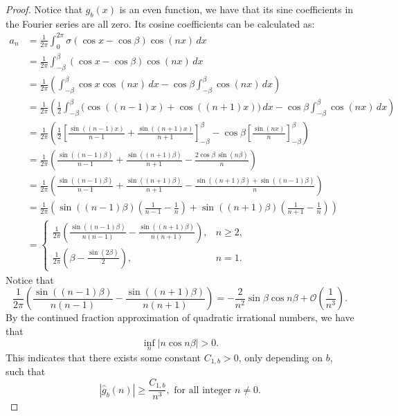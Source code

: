 \documentclass[12pt]{amsart}
\numberwithin{equation}{section}
\theoremstyle{remark}
\begin{document}
\begin{proof}
    Notice that $g_b(x)$ is an even function, we have that its sine coefficients in the Fourier series are all zero.
Its cosine coefficients can be calculated as:
\begin{equation}
\begin{aligned}
a_n &= \frac{1}{2\pi} \int_0^{2\pi} \sigma(\cos x - \cos \beta) \cos(nx)\,dx\\
&= \frac{1}{2\pi} \int_{-\beta}^{\beta} (\cos x - \cos \beta)\cos(nx)\,dx\\
&= \frac{1}{2\pi}\left(\int_{-\beta}^{\beta}\cos x\cos(nx)\,dx-\cos\beta\int_{-\beta}^{\beta}\cos(nx)\,dx\right)\\
&= \frac{1}{2\pi}\left(\frac{1}{2}\int_{-\beta}^{\beta}\big(\cos((n-1)x)+\cos((n+1)x)\big)\,dx-\cos\beta\int_{-\beta}^{\beta}\cos(nx)\,dx\right)\\
&= \frac{1}{2\pi}\left(\frac{1}{2}\left[\frac{\sin((n-1)x)}{n-1}+\frac{\sin((n+1)x)}{n+1}\right]_{-\beta}^{\beta}-\cos\beta\left[\frac{\sin(nx)}{n}\right]_{-\beta}^{\beta}\right)\\
&= \frac{1}{2\pi}\left(\frac{\sin((n-1)\beta)}{n-1}+\frac{\sin((n+1)\beta)}{n+1}-\frac{2\cos\beta\,\sin(n\beta)}{n}\right)\\
&= \frac{1}{2\pi}\left(\frac{\sin((n-1)\beta)}{n-1}+\frac{\sin((n+1)\beta)}{n+1}-\frac{\sin((n+1)\beta)+\sin((n-1)\beta)}{n}\right)\\
&= \frac{1}{2\pi}\left(\sin((n-1)\beta)\!\left(\frac{1}{n-1}-\frac{1}{n}\right)+\sin((n+1)\beta)\!\left(\frac{1}{n+1}-\frac{1}{n}\right)\right)\\
&=\begin{cases}
\displaystyle \frac{1}{2\pi}\!\left(\frac{\sin((n-1)\beta)}{n(n-1)}-\frac{\sin((n+1)\beta)}{n(n+1)}\right), & n\ge 2,\\[8pt]
\displaystyle \frac{1}{2\pi}\!\left(\beta-\frac{\sin(2\beta)}{2}\right), & n=1.
\end{cases}
\end{aligned}
\end{equation}
Notice that
\begin{equation}
    \frac{1}{2\pi}\!\left(\frac{\sin((n-1)\beta)}{n(n-1)}-\frac{\sin((n+1)\beta)}{n(n+1)}\right) = -\frac{2}{n^2}\sin\beta \cos n\beta +\mathcal O(\frac{1}{n^3}).
\end{equation}
By the continued fraction approximation of quadratic irrational numbers, we have that
\begin{equation}
    \inf_n{|n\cos n\beta|}>0.
\end{equation}
This indicates that there exists some constant $C_{1,b}>0$, only depending on $b$, such that
\begin{equation}
    |\hat g_b(n)|\ge \frac{C_{1,b}}{n^3}, \text{ for all integer } n\neq 0.
\end{equation}


\end{proof}
\end{document}
